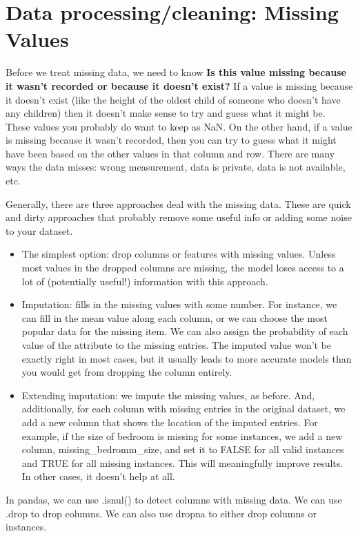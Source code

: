 \documentclass[12pt]{report}
\begin{document}
\section{Data processing/cleaning: Missing Values}
\label{sec:missing}

Before we treat missing data, we need to know \textbf{Is this value missing because it wasn't recorded or because it doesn't exist?} If a value is missing because it doesn't exist (like the height of the oldest child of someone who doesn't have any children) then it doesn't make sense to try and guess what it might be. These values you probably do want to keep as NaN. On the other hand, if a value is missing because it wasn't recorded, then you can try to guess what it might have been based on the other values in that column and row.  There are many ways the data misses: wrong measurement, data is private, data is not available, etc.

Generally, there are three approaches deal with the missing data. These are quick and dirty approaches that probably remove some useful info or adding some noise to your dataset.
\begin{itemize}
  \item The simplest option: drop columns or features with missing values. Unless most values in the dropped columns are missing, the model loses access to a lot of (potentially useful!) information with this approach.
  \item Imputation: fills in the missing values with some number. For instance, we can fill in the mean value along each column, or we can choose the most popular data for the missing item. We can also assign the probability of each value of the attribute to the missing entries. The imputed value won't be exactly right in most cases, but it usually leads to more accurate models than you would get from dropping the column entirely.
  \item Extending imputation: we impute the missing values, as before. And, additionally, for each column with missing entries in the original dataset, we add a new column that shows the location of the imputed entries. For example, if the size of bedroom is missing for some instances, we add a new column, missing\_bedromm\_size, and set it to FALSE for all valid instances and TRUE for all missing instances. This will meaningfully improve results. In other cases, it doesn't help at all.
\end{itemize}

In pandas, we can use .isnul() to detect columns with missing data. We can use .drop to drop columns. We can also use dropna to either drop columns or instances.
\end{document}
